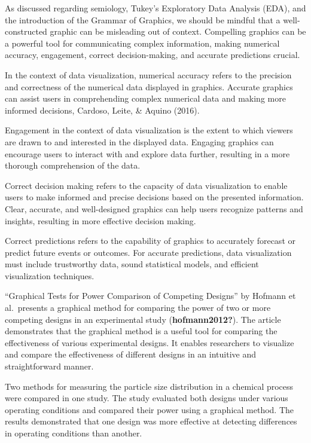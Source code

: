 \documentclass[print]{nuthesis}
\begin{document}
As discussed regarding semiology, Tukey's Exploratory Data Analysis (EDA), and the introduction of the Grammar of Graphics, we should be mindful that a well-constructed graphic can be misleading out of context.
Compelling graphics can be a powerful tool for communicating complex information, making numerical accuracy, engagement, correct decision-making, and accurate predictions crucial.

In the context of data visualization, numerical accuracy refers to the precision and correctness of the numerical data displayed in graphics.
Accurate graphics can assist users in comprehending complex numerical data and making more informed decisions, Cardoso, Leite, \& Aquino (2016).

Engagement in the context of data visualization is the extent to which viewers are drawn to and interested in the displayed data.
Engaging graphics can encourage users to interact with and explore data further, resulting in a more thorough comprehension of the data.

Correct decision making refers to the capacity of data visualization to enable users to make informed and precise decisions based on the presented information.
Clear, accurate, and well-designed graphics can help users recognize patterns and insights, resulting in more effective decision making.

Correct predictions refers to the capability of graphics to accurately forecast or predict future events or outcomes.
For accurate predictions, data visualization must include trustworthy data, sound statistical models, and efficient visualization techniques.

``Graphical Tests for Power Comparison of Competing Designs'' by Hofmann et al.~presents a graphical method for comparing the power of two or more competing designs in an experimental study (\textbf{hofmann2012?}).
The article demonstrates that the graphical method is a useful tool for comparing the effectiveness of various experimental designs.
It enables researchers to visualize and compare the effectiveness of different designs in an intuitive and straightforward manner.

Two methods for measuring the particle size distribution in a chemical process were compared in one study.
The study evaluated both designs under various operating conditions and compared their power using a graphical method.
The results demonstrated that one design was more effective at detecting differences in operating conditions than another.
\end{document}
